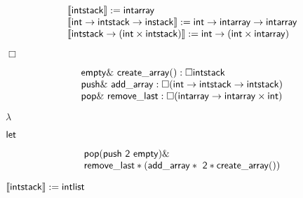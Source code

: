 \documentclass[10pt]{book}
\begin{document}
\begin{mdSnippets}
\begin{mdDisplaySnippet}[97210db0216d148c80d2a671ff4f1a84]
\[\begin{array}{l}
  \llbracket {\sf intstack} \rrbracket:= {\sf intarray} \\  
  \llbracket {\sf int \rightarrow intstack\rightarrow instack } \rrbracket:= {\sf int \rightarrow intarray\rightarrow intarray} \\
  \llbracket {\sf intstack \rightarrow (int \times intstack)} \rrbracket:= {\sf int\rightarrow (int\times intarray)}\\
  \end{array}
\]%
\end{mdDisplaySnippet}%
\begin{mdInlineSnippet}[c3880bc63c2b0fd10cdc024cf76a1924]%
$\Box$\end{mdInlineSnippet}%
\begin{mdDisplaySnippet}%
\[%
  \begin{array}{l}
  { \sf empty \& \  create\_array():\Box intstack} \\
    {\sf  push \&\  add\_array  :\Box (int \rightarrow intstack\rightarrow intstack)}\\
  {\sf  pop   \&\  remove\_last: \Box (intarray\rightarrow intarray\times int)}
  \end{array}
\]%
\end{mdDisplaySnippet}%
\begin{mdInlineSnippet}[c6a6eb61fd9c6c913da73b3642ca147d]%
$\lambda$\end{mdInlineSnippet}%
\begin{mdInlineSnippet}[0dd9ba8209181a52091dcd102fc1c48d]%
${\sf let}$\end{mdInlineSnippet}%
\begin{mdDisplaySnippet}[84b279b47e5dcb164ff5a309a7a32799]%
\[%
\begin{array}{l l}
{\sf pop (push\ 2 \ empty)} \&  \\
{\sf remove\_last*(add\_array*\ 2 * create\_array())}
\end{array}
\]%
\end{mdDisplaySnippet}%
\begin{mdInlineSnippet}[263f6cde9cf189e21199080a34d52250]%
${\sf \llbracket intstack\rrbracket := intlist}$\end{mdInlineSnippet}%
\begin{mdDisplaySnippet}[cc58b2c7d12911175f7fb796802cbc38]%

\end{mdDisplaySnippet}
\end{mdSnippets}
\end{document}
